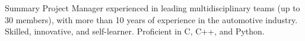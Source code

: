 
\summary
    {Summary}
    {Project Manager experienced in leading multidisciplinary teams (up to 30 members), with more than 10 years of experience in the automotive industry. Skilled, innovative, and self-learner. Proficient in C, C++, and Python.}

